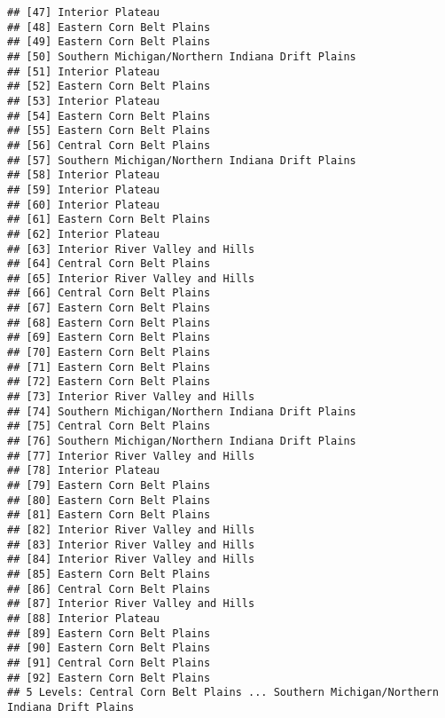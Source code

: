 \documentclass[
]{article}
\begin{document}
\begin{verbatim}
## [47] Interior Plateau                               
## [48] Eastern Corn Belt Plains                       
## [49] Eastern Corn Belt Plains                       
## [50] Southern Michigan/Northern Indiana Drift Plains
## [51] Interior Plateau                               
## [52] Eastern Corn Belt Plains                       
## [53] Interior Plateau                               
## [54] Eastern Corn Belt Plains                       
## [55] Eastern Corn Belt Plains                       
## [56] Central Corn Belt Plains                       
## [57] Southern Michigan/Northern Indiana Drift Plains
## [58] Interior Plateau                               
## [59] Interior Plateau                               
## [60] Interior Plateau                               
## [61] Eastern Corn Belt Plains                       
## [62] Interior Plateau                               
## [63] Interior River Valley and Hills                
## [64] Central Corn Belt Plains                       
## [65] Interior River Valley and Hills                
## [66] Central Corn Belt Plains                       
## [67] Eastern Corn Belt Plains                       
## [68] Eastern Corn Belt Plains                       
## [69] Eastern Corn Belt Plains                       
## [70] Eastern Corn Belt Plains                       
## [71] Eastern Corn Belt Plains                       
## [72] Eastern Corn Belt Plains                       
## [73] Interior River Valley and Hills                
## [74] Southern Michigan/Northern Indiana Drift Plains
## [75] Central Corn Belt Plains                       
## [76] Southern Michigan/Northern Indiana Drift Plains
## [77] Interior River Valley and Hills                
## [78] Interior Plateau                               
## [79] Eastern Corn Belt Plains                       
## [80] Eastern Corn Belt Plains                       
## [81] Eastern Corn Belt Plains                       
## [82] Interior River Valley and Hills                
## [83] Interior River Valley and Hills                
## [84] Interior River Valley and Hills                
## [85] Eastern Corn Belt Plains                       
## [86] Central Corn Belt Plains                       
## [87] Interior River Valley and Hills                
## [88] Interior Plateau                               
## [89] Eastern Corn Belt Plains                       
## [90] Eastern Corn Belt Plains                       
## [91] Central Corn Belt Plains                       
## [92] Eastern Corn Belt Plains                       
## 5 Levels: Central Corn Belt Plains ... Southern Michigan/Northern Indiana Drift Plains
\end{verbatim}
\end{document}
